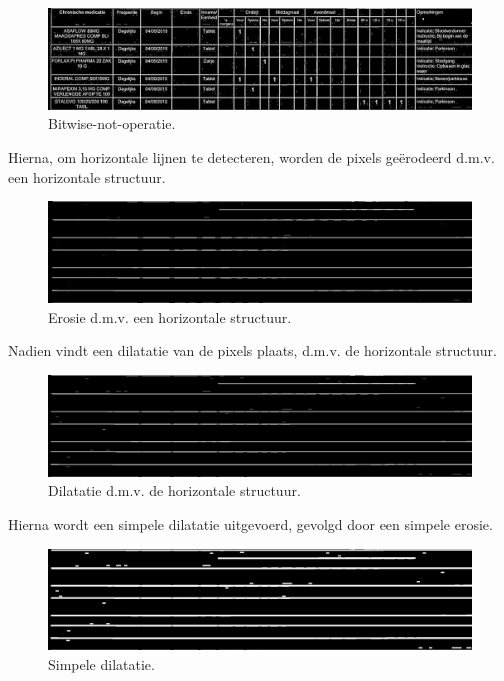 \begin{figure}[H]
    \centering
    \includegraphics[width=1\textwidth]{img/line_detection_a_2_bitwise_not_on_image.png}
    \caption{Bitwise-not-operatie.}
\end{figure}

Hierna, om horizontale lijnen te detecteren, worden de pixels geërodeerd d.m.v. een horizontale structuur.

\begin{figure}[H]
    \centering
    \includegraphics[width=1\textwidth]{img/line_detection_a_3_erode_horizontal_structure_for_horizontal_lines.png}
    \caption{Erosie d.m.v. een horizontale structuur.}
\end{figure}

Nadien vindt een dilatatie van de pixels plaats, d.m.v. de horizontale structuur.

\begin{figure}[H]
    \centering
    \includegraphics[width=1\textwidth]{img/line_detection_a_4_dilate_horizontal_structure_for_horizontal_lines.png}
    \caption{Dilatatie d.m.v. de horizontale structuur.}
\end{figure}

Hierna wordt een simpele dilatatie uitgevoerd, gevolgd door een simpele erosie.

\begin{figure}[H]
    \centering
    \includegraphics[width=1\textwidth]{img/line_detection_a_5_dilate_image_for_horizontal_lines.png}
    \caption{Simpele dilatatie.}
\end{figure}


